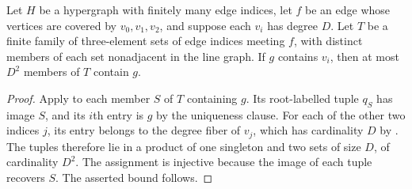 \begin{lemma}
Let $H$ be a hypergraph with finitely many edge indices, let $f$ be an
edge whose vertices are covered by $v_0,v_1,v_2$, and suppose each
$v_i$ has degree $D$. Let $T$ be a finite family of three-element sets
of edge indices meeting $f$, with distinct members of each set
nonadjacent in the line graph. If $g$ contains $v_i$, then at most
$D^2$ members of $T$ contain $g$.
\end{lemma}
\begin{proof}
Apply  to each
member $S$ of $T$ containing $g$. Its root-labelled tuple $q_S$ has
image $S$, and its $i$th entry is $g$ by the uniqueness clause.
For each of the other two indices $j$, its entry belongs to the
degree fiber of $v_j$, which has cardinality $D$ by
. The tuples therefore lie in a product of
one singleton and two sets of size $D$, of cardinality $D^2$.
The assignment is injective because the image of each tuple recovers
$S$. The asserted bound follows.
\end{proof}
